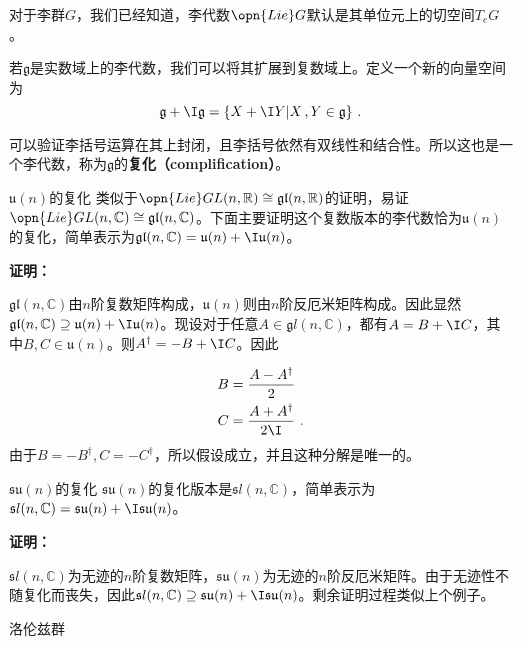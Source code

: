 
对于李群$G$，我们已经知道，李代数$\opn{Lie} G$默认是其单位元上的切空间$T_eG$。
\begin{definition}{}
若$\mathfrak g$是实数域上的李代数，我们可以将其扩展到复数域上。定义一个新的向量空间为
\begin{equation}
\mathfrak g+\I \mathfrak g=\{X+\I Y|X\,,Y\in\mathfrak g\}~.
\end{equation}
\end{definition}
可以验证李括号运算在其上封闭，且李括号依然有双线性和结合性。所以这也是一个李代数，称为$\mathfrak g$的\textbf{复化（complification）}。
\begin{example}{$\mathfrak u(n)$的复化}
类似于$\opn{Lie}GL(n,\mathbb R)\cong \mathfrak{gl}(n,\mathbb R)$的证明，易证$\opn{Lie}GL(n,\mathbb C)\cong \mathfrak{gl}(n,\mathbb C)$。下面主要证明这个复数版本的李代数恰为$\mathfrak u(n)$的复化，简单表示为$\mathfrak{gl}(n,\mathbb C)=\mathfrak u(n)+\I \mathfrak u(n)$。

\textbf{证明：}

$\mathfrak{gl}(n,\mathbb C)$由$n$阶复数矩阵构成，$\mathfrak u(n)$则由$n$阶反厄米矩阵构成。因此显然$\mathfrak{gl}(n,\mathbb C)\supseteq \mathfrak u(n)+\I \mathfrak u(n)$。现设对于任意$A\in \mathfrak gl(n,\mathbb C)$，都有$A=B+\I C$，其中$B,C\in \mathfrak u(n)$。则$A^{\dagger}=-B+\I C$。因此

\begin{equation}
\begin{aligned}
B&=\frac{A-A^{\dagger}}{2}\\
C&= \frac{A+A^{\dagger}}{2\I}~.
\end{aligned}
\end{equation}
由于$B=-B^{\dagger},C=-C^{\dagger}$，所以假设成立，并且这种分解是唯一的。

\end{example}
\begin{example}{$\mathfrak {su}(n)$的复化}
$\mathfrak {su}(n)$的复化版本是$\mathfrak sl(n,\mathbb C)$，简单表示为$\mathfrak sl(n,\mathbb C)=\mathfrak {su}(n)+\I \mathfrak {su}(n)$。

\textbf{证明：}

$\mathfrak sl(n,\mathbb C)$为无迹的$n$阶复数矩阵，$\mathfrak {su}(n)$为无迹的$n$阶反厄米矩阵。由于无迹性不随复化而丧失，因此$\mathfrak sl(n,\mathbb C)\supseteq \mathfrak {su}(n)+\I \mathfrak {su}(n)$。剩余证明过程类似上个例子。
\end{example}
\begin{example}{洛伦兹群}

\end{example}